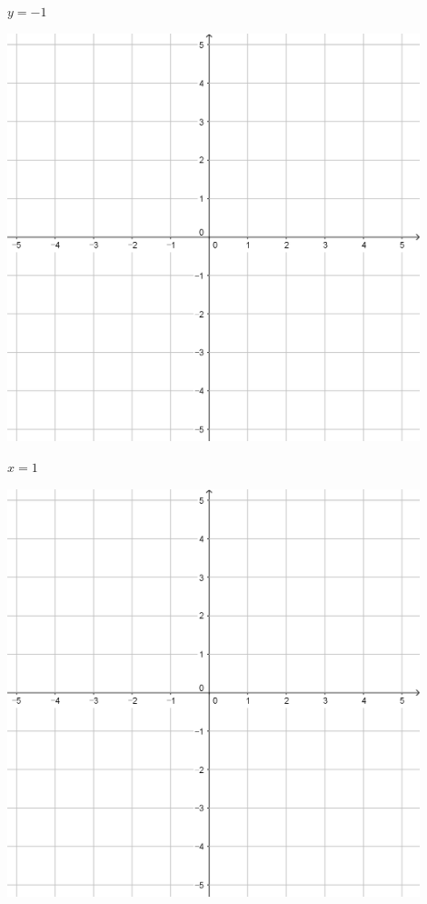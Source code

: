 \documentclass[a4paper]{oblivoir}
\begin{document}
\begin{minipage}{0.45\textwidth}\centering
\(y=-1\)
\par\bigskip\includegraphics[width=0.9\textwidth]{55}
\end{minipage}
\begin{minipage}{0.45\textwidth}\centering
\(x=1\)
\par\bigskip\includegraphics[width=0.9\textwidth]{55}
\end{minipage}\bigskip\bigskip\par
\end{document}
